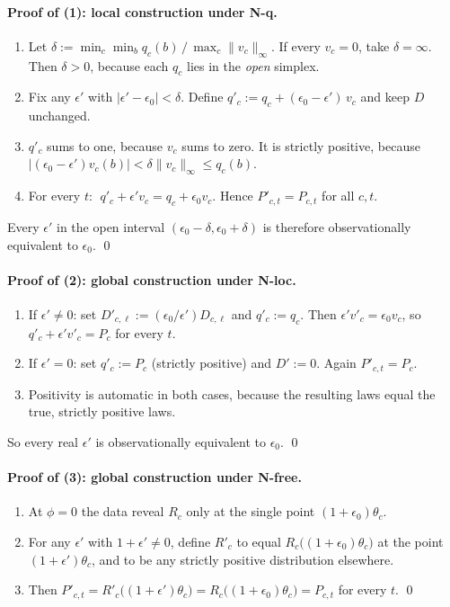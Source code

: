 \documentclass[11pt,a4paper]{article}
\theoremstyle{plain}
\theoremstyle{definition}
\theoremstyle{remark}
\newcommand{\eps}{\epsilon}
\newcommand{\norm}[1]{\lVert #1\rVert}
\begin{document}
\paragraph{Proof of (1): local construction under N-q.}
\begin{enumerate}[label=\textbf{Step \arabic*.},leftmargin=*,itemsep=2pt]
\item Let $\delta := \min_c \min_b q_c(b) \,/\, \max_c \norm{v_c}_\infty$. If every $v_c=0$, take $\delta=\infty$.
Then $\delta>0$, because each $q_c$ lies in the \emph{open} simplex.
\item Fix any $\eps'$ with $|\eps'-\eps_0|<\delta$. Define $q'_c := q_c + (\eps_0-\eps')\,v_c$ and keep $D$ unchanged.
\item $q'_c$ sums to one, because $v_c$ sums to zero. It is strictly positive, because
$|(\eps_0-\eps')v_c(b)| < \delta\norm{v_c}_\infty \le q_c(b)$.
\item For every $t$: $\;q'_c+\eps' v_c = q_c + \eps_0 v_c$. Hence $P'_{c,t}=P_{c,t}$ for all $c,t$.
\end{enumerate}
Every $\eps'$ in the open interval $(\eps_0-\delta,\eps_0+\delta)$ is therefore observationally equivalent to $\eps_0$. \qed

\paragraph{Proof of (2): global construction under N-loc.}
\begin{enumerate}[label=\textbf{Step \arabic*.},leftmargin=*,itemsep=2pt]
\item If $\eps'\neq0$: set $D'_{c,\ell}:=(\eps_0/\eps')D_{c,\ell}$ and $q'_c:=q_c$. Then $\eps' v'_c=\eps_0 v_c$,
so $q'_c+\eps' v'_c = P_c$ for every $t$.
\item If $\eps'=0$: set $q'_c := P_c$ (strictly positive) and $D':=0$. Again $P'_{c,t}=P_c$.
\item Positivity is automatic in both cases, because the resulting laws equal the true, strictly positive laws.
\end{enumerate}
So every real $\eps'$ is observationally equivalent to $\eps_0$. \qed

\paragraph{Proof of (3): global construction under N-free.}
\begin{enumerate}[label=\textbf{Step \arabic*.},leftmargin=*,itemsep=2pt]
\item At $\phi=0$ the data reveal $R_c$ only at the single point $(1+\eps_0)\theta_c$.
\item For any $\eps'$ with $1+\eps'\neq0$, define $R'_c$ to equal $R_c\big((1+\eps_0)\theta_c\big)$ at the
point $(1+\eps')\theta_c$, and to be any strictly positive distribution elsewhere.
\item Then $P'_{c,t}=R'_c\big((1+\eps')\theta_c\big)=R_c\big((1+\eps_0)\theta_c\big)=P_{c,t}$ for every $t$. \qed
\end{enumerate}
\end{document}
